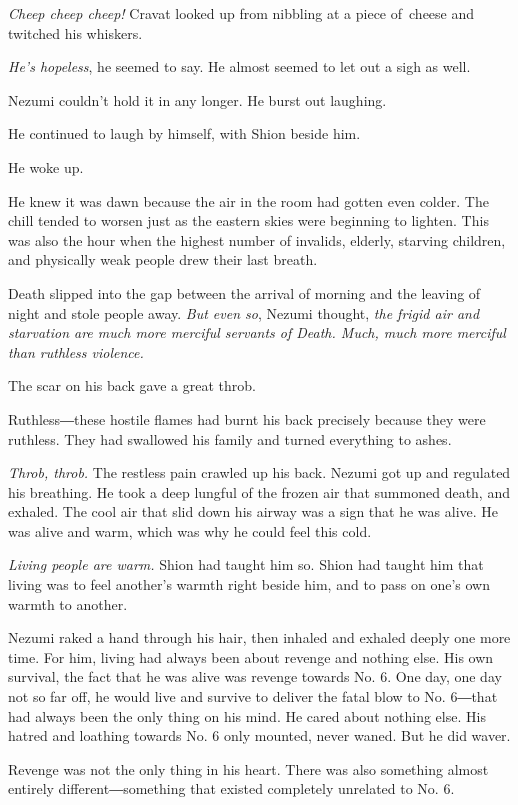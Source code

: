 \emph{Cheep cheep cheep!} Cravat looked up from nibbling at a piece of~cheese
and twitched his whiskers.

\emph{He's hopeless}, he seemed to say. He almost seemed to let out a sigh as
well.

Nezumi couldn't hold it in any longer. He burst out laughing.

He continued to laugh by himself, with Shion beside him.

\myspace

He woke up.

He knew it was dawn because the air in the room had gotten even colder.
The chill tended to worsen just as the eastern skies were beginning to
lighten. This was also the hour when the highest number of invalids,
elderly, starving children, and physically weak people drew their last
breath.

Death slipped into the gap between the arrival of morning and the
leaving of night and stole people away. \emph{But even so}, Nezumi thought, \emph{the
frigid air and starvation are much more merciful servants of Death.
Much, much more merciful than ruthless violence.}

The scar on his back gave a great throb.

Ruthless―these hostile flames had burnt his back precisely because they
were ruthless. They had swallowed his family and turned everything to
ashes.

\emph{Throb, throb.} The restless pain crawled up his back. Nezumi got up and
regulated his breathing. He took a deep lungful of the frozen air that
summoned death, and exhaled. The cool air that slid down his airway was
a sign that he was alive. He was alive and warm, which was why he could
feel this cold.

\emph{Living people are warm.} Shion had taught him so. Shion had taught him
that living was to feel another's warmth right beside him, and to pass
on one's own warmth to another.

Nezumi raked a hand through his hair, then inhaled and exhaled deeply
one more time. For him, living had always been about revenge and nothing
else. His own survival, the fact that he was alive was revenge towards
No. 6. One day, one day not so far off, he would live and survive to
deliver the fatal blow to No. 6―that had always been the only thing on
his mind. He cared about nothing else. His hatred and loathing towards
No. 6 only mounted, never waned. But he did waver.

Revenge was not the only thing in his heart. There was also something
almost entirely different―something that existed completely unrelated to
No. 6.

